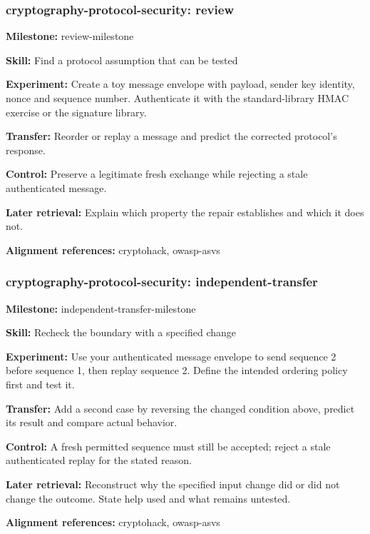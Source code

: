\subsubsection{cryptography-protocol-security: review}
\noindent\textbf{Milestone:} review-milestone\par
\noindent\textbf{Skill:} Find a protocol assumption that can be tested\par
\noindent\textbf{Experiment:} Create a toy message envelope with payload, sender key identity, nonce and sequence number. Authenticate it with the standard-library HMAC exercise or the signature library.\par
\noindent\textbf{Transfer:} Reorder or replay a message and predict the corrected protocol's response.\par
\noindent\textbf{Control:} Preserve a legitimate fresh exchange while rejecting a stale authenticated message.\par
\noindent\textbf{Later retrieval:} Explain which property the repair establishes and which it does not.\par
\noindent\textbf{Alignment references:} cryptohack, owasp-asvs\par
\subsubsection{cryptography-protocol-security: independent-transfer}
\noindent\textbf{Milestone:} independent-transfer-milestone\par
\noindent\textbf{Skill:} Recheck the boundary with a specified change\par
\noindent\textbf{Experiment:} Use your authenticated message envelope to send sequence 2 before sequence 1, then replay sequence 2. Define the intended ordering policy first and test it.\par
\noindent\textbf{Transfer:} Add a second case by reversing the changed condition above, predict its result and compare actual behavior.\par
\noindent\textbf{Control:} A fresh permitted sequence must still be accepted; reject a stale authenticated replay for the stated reason.\par
\noindent\textbf{Later retrieval:} Reconstruct why the specified input change did or did not change the outcome. State help used and what remains untested.\par
\noindent\textbf{Alignment references:} cryptohack, owasp-asvs\par
